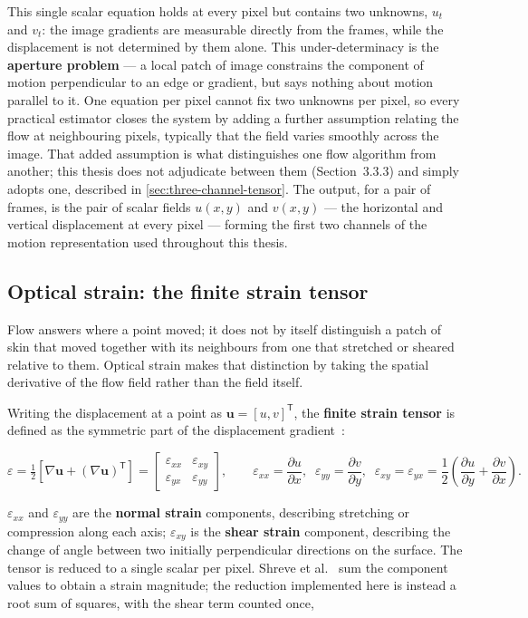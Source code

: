 This single scalar equation holds at every pixel but contains two unknowns, $u_t$ and $v_t$: the image gradients are measurable directly from the frames, while the displacement is not determined by them alone. This under-determinacy is the \textbf{aperture problem} --- a local patch of image constrains the component of motion perpendicular to an edge or gradient, but says nothing about motion parallel to it. One equation per pixel cannot fix two unknowns per pixel, so every practical estimator closes the system by adding a further assumption relating the flow at neighbouring pixels, typically that the field varies smoothly across the image. That added assumption is what distinguishes one flow algorithm from another; this thesis does not adjudicate between them (Section~3.3.3) and simply adopts one, described in \autoref{sec:three-channel-tensor}. The output, for a pair of frames, is the pair of scalar fields $u(x,y)$ and $v(x,y)$ --- the horizontal and vertical displacement at every pixel --- forming the first two channels of the motion representation used throughout this thesis.

\subsection{Optical strain: the finite strain tensor}
\label{sec:optical-strain}

Flow answers where a point moved; it does not by itself distinguish a patch of skin that moved together with its neighbours from one that stretched or sheared relative to them. Optical strain makes that distinction by taking the spatial derivative of the flow field rather than the field itself.

Writing the displacement at a point as $\mathbf{u} = [u, v]^{\mathsf T}$, the \textbf{finite strain tensor} is defined as the symmetric part of the displacement gradient~\cite{shreve2011}:

\[
	\varepsilon = \tfrac{1}{2}\left[\nabla\mathbf{u} + (\nabla\mathbf{u})^{\mathsf T}\right] = \begin{bmatrix} \varepsilon_{xx} & \varepsilon_{xy} \\ \varepsilon_{yx} & \varepsilon_{yy} \end{bmatrix}, \qquad \varepsilon_{xx} = \frac{\partial u}{\partial x},\;\; \varepsilon_{yy} = \frac{\partial v}{\partial y},\;\; \varepsilon_{xy} = \varepsilon_{yx} = \frac{1}{2}\left(\frac{\partial u}{\partial y} + \frac{\partial v}{\partial x}\right).
\]

$\varepsilon_{xx}$ and $\varepsilon_{yy}$ are the \textbf{normal strain} components, describing stretching or compression along each axis; $\varepsilon_{xy}$ is the \textbf{shear strain} component, describing the change of angle between two initially perpendicular directions on the surface. The tensor is reduced to a single scalar per pixel. Shreve et al.~\cite{shreve2011} sum the component values to obtain a strain magnitude; the reduction implemented here is instead a root sum of squares, with the shear term counted once,

